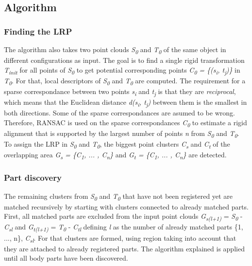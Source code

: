 \documentclass[notitlepage,english]{hgbreport}
\begin{document}
\subsection{Algorithm} 

\subsubsection{Finding the LRP}

The algorithm also takes two point clouds \textit{S\textsubscript{0}} and \textit{T\textsubscript{0}} of the same object in different configurations as input.
The goal is to find a single rigid transformation \textit{T\textsubscript{init}} for all points of \textit{S\textsubscript{0}} to get potential corresponding points \textit{C\textsubscript{0} = \{(s\textsubscript{i}, t\textsubscript{j})\}} in \textit{T\textsubscript{0}}. For that, local descriptors of \textit{S\textsubscript{0}} and \textit{T\textsubscript{0}} are computed. The requirement for a sparse correspondance between two points \textit{s\textsubscript{i}} and \textit{t\textsubscript{j}}  is that they are \textit{reciprocal}, which means that the Euclidean distance \textit{d(s\textsubscript{i}, t\textsubscript{j})} between them is the smallest in both directions. Some of the sparse correspondances are asumed to be wrong. Therefore, RANSAC is used on the sparse correspondances \textit{C\textsubscript{0}} to estimate a rigid alignment that is supported by the largest number of points \textit{n} from \textit{S\textsubscript{0}} and \textit{T\textsubscript{0}}. To assign the LRP in \textit{S\textsubscript{0}} and \textit{T\textsubscript{0}}, the biggest point clusters \textit{C\textsubscript{s}} and \textit{C\textsubscript{t}} of the overlapping area \textit{G\textsubscript{s} = \{C\textsubscript{1}, ... , C\textsubscript{n}\} } and \textit{G\textsubscript{t} = \{C\textsubscript{1}, ... , C\textsubscript{n}\} } are detected. 


\subsubsection{Part discovery}

The remaining clusters from \textit{S\textsubscript{0}} and \textit{T\textsubscript{0}} that have not been registered yet are matched recursively by starting with clusters connected to already matched parts. First, all matched parts are excluded from the input point clouds  \textit{G\textsubscript{s(l+1)}} = \textit{S\textsubscript{0}} - \textit{C\textsubscript{sl}} and \textit{G\textsubscript{t(l+1)}} = \textit{T\textsubscript{0}} - \textit{C\textsubscript{tl}} defining \textit{l} as the number of already matched parts \{1, ..., n\}, \textit{C\textsubscript{sl}}. For that clusters are formed, using region taking into account that they are attached to already registered parts. The algorithm explained is applied until all body parts have been discovered.
\end{document}

